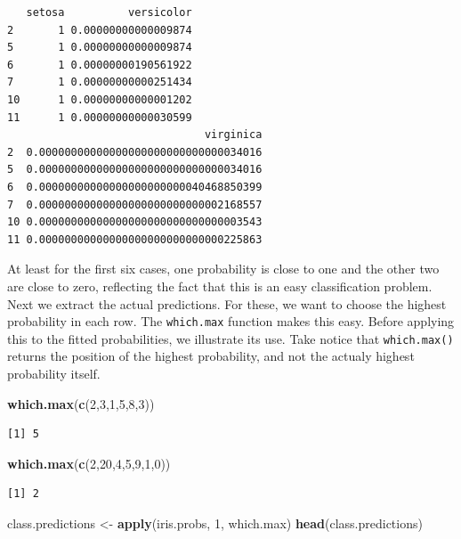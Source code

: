 \documentclass[
]{krantz}
\makeatletter
\newenvironment{Shaded}{\begin{snugshade}}{\end{snugshade}}
\newcommand{\DecValTok}[1]{\textcolor[rgb]{0.06,0.06,0.06}{#1}}
\newcommand{\KeywordTok}[1]{\textcolor[rgb]{0.27,0.27,0.27}{\textbf{#1}}}
\newcommand{\NormalTok}[1]{#1}
\newcommand{\StringTok}[1]{\textcolor[rgb]{0.5,0.5,0.5}{#1}}
\newenvironment{kframe}{%
\medskip{}
\setlength{\fboxsep}{.8em}
 \def\at@end@of@kframe{}%
 \ifinner\ifhmode%
  \def\at@end@of@kframe{\end{minipage}}%
  \begin{minipage}{\columnwidth}%
 \fi\fi%
 \def\FrameCommand##1{\hskip\@totalleftmargin \hskip-\fboxsep
 \colorbox{shadecolor}{##1}\hskip-\fboxsep
     \hskip-\linewidth \hskip-\@totalleftmargin \hskip\columnwidth}%
 \MakeFramed {\advance\hsize-\width
   \@totalleftmargin\z@ \linewidth\hsize
   \@setminipage}}%
 {\par\unskip\endMakeFramed%
 \at@end@of@kframe}
\renewenvironment{Shaded}{\begin{kframe}}{\end{kframe}}
\makeatother
\begin{document}
\begin{verbatim}
   setosa          versicolor
2       1 0.00000000000009874
5       1 0.00000000000009874
6       1 0.00000000190561922
7       1 0.00000000000251434
10      1 0.00000000000001202
11      1 0.00000000000030599
                               virginica
2  0.00000000000000000000000000000034016
5  0.00000000000000000000000000000034016
6  0.00000000000000000000000040468850399
7  0.00000000000000000000000000002168557
10 0.00000000000000000000000000000003543
11 0.00000000000000000000000000000225863
\end{verbatim}

At least for the first six cases, one probability is close to one and the other two are close to zero, reflecting the fact that this is an easy classification problem. Next we extract the actual predictions. For these, we want to choose the highest probability in each row. The \texttt{which.max} function makes this easy. Before applying this to the fitted probabilities, we illustrate its use. Take notice that \texttt{which.max()} returns the position of the highest probability, and not the actualy highest probability itself.

\begin{Shaded}
\begin{Highlighting}[]
\KeywordTok{which.max}\NormalTok{(}\KeywordTok{c}\NormalTok{(}\DecValTok{2}\NormalTok{,}\DecValTok{3}\NormalTok{,}\DecValTok{1}\NormalTok{,}\DecValTok{5}\NormalTok{,}\DecValTok{8}\NormalTok{,}\DecValTok{3}\NormalTok{))}
\end{Highlighting}
\end{Shaded}

\begin{verbatim}
[1] 5
\end{verbatim}

\begin{Shaded}
\begin{Highlighting}[]
\KeywordTok{which.max}\NormalTok{(}\KeywordTok{c}\NormalTok{(}\DecValTok{2}\NormalTok{,}\DecValTok{20}\NormalTok{,}\DecValTok{4}\NormalTok{,}\DecValTok{5}\NormalTok{,}\DecValTok{9}\NormalTok{,}\DecValTok{1}\NormalTok{,}\DecValTok{0}\NormalTok{))}
\end{Highlighting}
\end{Shaded}

\begin{verbatim}
[1] 2
\end{verbatim}

\begin{Shaded}
\begin{Highlighting}[]
\NormalTok{class.predictions \textless{}{-}}\StringTok{ }\KeywordTok{apply}\NormalTok{(iris.probs, }\DecValTok{1}\NormalTok{, which.max)}
\KeywordTok{head}\NormalTok{(class.predictions)}
\end{Highlighting}
\end{Shaded}
\end{document}
